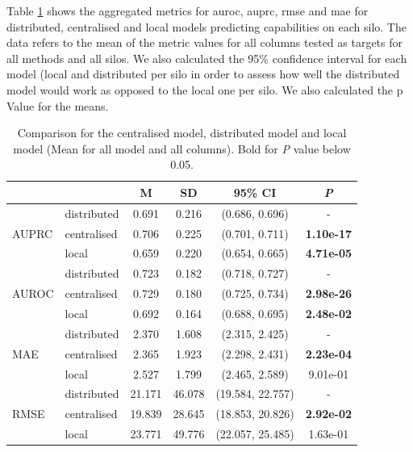 Table \ref{tab:allvsall} shows the aggregated metrics for \ac{auroc}, \ac{auprc}, \ac{rmse} and \ac{mae} for distributed, centralised and local models predicting capabilities on each silo. The data refers to the mean of the metric values for all columns tested as targets for all methods and all silos. We also calculated the 95\% confidence interval for each model (local and distributed per silo in order to assess how well the distributed model would work as opposed to the local one per silo. We also calculated the p Value for the means.

\begin{table}[htbp] 
 \setlength{\tabcolsep}{7pt} %
 \renewcommand{\arraystretch}{1.3} %
  \captionsetup{justification=centering} 
\centering
\caption[Metrics for centralised model, distributed model and local model]{Comparison for the centralised model, distributed model and local model (Mean for all model and all columns). Bold for \textit{P} value below 0.05.}
\label{tab:allvsall}
\begin{tabular}{llcccc}
\toprule
 &  & M & SD & 95\% CI & \textit{P}  \\
\midrule
\multirow[t]{3}{*}{AUPRC}
 & distributed & 0.691 & 0.216 & (0.686, 0.696) & - \\
  & centralised & 0.706 & 0.225 & (0.701, 0.711) & \bfseries 1.10e-17 \\
 & local & 0.659 & 0.220 & (0.654, 0.665) & \bfseries 4.71e-05 \\
 \hline

\multirow[t]{3}{*}{AUROC} 
 & distributed & 0.723 & 0.182 & (0.718, 0.727) & - \\
 & centralised & 0.729 & 0.180 & (0.725, 0.734) & \bfseries 2.98e-26 \\
 & local & 0.692 & 0.164 & (0.688, 0.695) & \bfseries 2.48e-02 \\

\hline

\multirow[t]{3}{*}{MAE} 
 & distributed & 2.370 & 1.608 & (2.315, 2.425) & - \\
 & centralised & 2.365 & 1.923 & (2.298, 2.431) & \bfseries 2.23e-04 \\
 & local & 2.527 & 1.799 & (2.465, 2.589) & 9.01e-01 \\

\hline

\multirow[t]{3}{*}{RMSE} 
 & distributed & 21.171 & 46.078 & (19.584, 22.757) & - \\
 & centralised & 19.839 & 28.645 & (18.853, 20.826) & \bfseries 2.92e-02 \\
 & local & 23.771 & 49.776 & (22.057, 25.485) & 1.63e-01 \\
\hline
\end{tabular}
\end{table}





